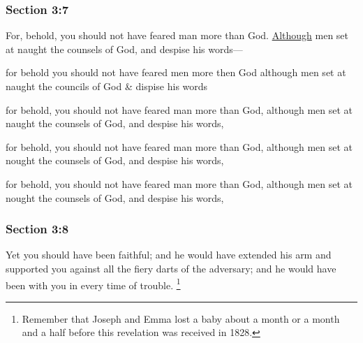 	\subsubsection{Section 3:7} %
		\label{DC3-7}

		For, behold, you should not have feared man more than God. \hyperref[ALTHOUGH]{Although} men set at naught the counsels of God, and despise his words---

		\begin{framed}
		\scriptsize
			\begin{compactdesc}
				\item[JSP] for behold you should not have feared men more then God although men set at naught the councils of God \& dispise his words
				\item[BC] for behold, you should not have feared man more than God, although men set at naught the counsels of God, and despise his words,
				\item[DC 1835] for behold, you should not have feared man more than God, although men set at nought the counsels of God, and despise his words,
				\item[DC 1844] for behold, you should not have feared man more than God, although men set at nought the counsels of God, and despise his words, 
			\end{compactdesc}
		\end{framed}

	\subsubsection{Section 3:8} %
		\label{DC3-8}

		Yet you should have been faithful; and he would have extended his arm and supported you against all the fiery darts of the adversary; and he would have been with you in every time of trouble.%
			\footnote{%
				Remember that Joseph and Emma lost a baby about a month or a month and a half before this revelation was received in 1828.
				}

